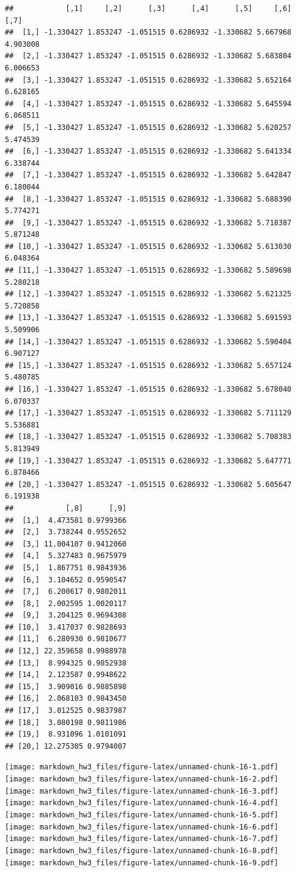 \documentclass[]{article}
\begin{document}
\begin{verbatim}
##            [,1]     [,2]      [,3]      [,4]      [,5]     [,6]     [,7]
##  [1,] -1.330427 1.853247 -1.051515 0.6286932 -1.330682 5.667968 4.903008
##  [2,] -1.330427 1.853247 -1.051515 0.6286932 -1.330682 5.683804 6.006653
##  [3,] -1.330427 1.853247 -1.051515 0.6286932 -1.330682 5.652164 6.628165
##  [4,] -1.330427 1.853247 -1.051515 0.6286932 -1.330682 5.645594 6.068511
##  [5,] -1.330427 1.853247 -1.051515 0.6286932 -1.330682 5.620257 5.474539
##  [6,] -1.330427 1.853247 -1.051515 0.6286932 -1.330682 5.641334 6.338744
##  [7,] -1.330427 1.853247 -1.051515 0.6286932 -1.330682 5.642847 6.180044
##  [8,] -1.330427 1.853247 -1.051515 0.6286932 -1.330682 5.688390 5.774271
##  [9,] -1.330427 1.853247 -1.051515 0.6286932 -1.330682 5.718387 5.871248
## [10,] -1.330427 1.853247 -1.051515 0.6286932 -1.330682 5.613030 6.048364
## [11,] -1.330427 1.853247 -1.051515 0.6286932 -1.330682 5.589698 5.280218
## [12,] -1.330427 1.853247 -1.051515 0.6286932 -1.330682 5.621325 5.720858
## [13,] -1.330427 1.853247 -1.051515 0.6286932 -1.330682 5.691593 5.509906
## [14,] -1.330427 1.853247 -1.051515 0.6286932 -1.330682 5.590404 6.907127
## [15,] -1.330427 1.853247 -1.051515 0.6286932 -1.330682 5.657124 5.480785
## [16,] -1.330427 1.853247 -1.051515 0.6286932 -1.330682 5.678040 6.070337
## [17,] -1.330427 1.853247 -1.051515 0.6286932 -1.330682 5.711129 5.536881
## [18,] -1.330427 1.853247 -1.051515 0.6286932 -1.330682 5.708383 5.813949
## [19,] -1.330427 1.853247 -1.051515 0.6286932 -1.330682 5.647771 6.878466
## [20,] -1.330427 1.853247 -1.051515 0.6286932 -1.330682 5.605647 6.191938
##            [,8]      [,9]
##  [1,]  4.473581 0.9799366
##  [2,]  3.738244 0.9552652
##  [3,] 11.004107 0.9412060
##  [4,]  5.327483 0.9675979
##  [5,]  1.867751 0.9843936
##  [6,]  3.104652 0.9590547
##  [7,]  6.200617 0.9802011
##  [8,]  2.002595 1.0020117
##  [9,]  3.204125 0.9694308
## [10,]  3.417037 0.9828693
## [11,]  6.280930 0.9810677
## [12,] 22.359658 0.9988978
## [13,]  8.994325 0.9852938
## [14,]  2.123587 0.9948622
## [15,]  3.909016 0.9885898
## [16,]  2.068103 0.9843450
## [17,]  3.012525 0.9837987
## [18,]  3.080198 0.9811986
## [19,]  8.931096 1.0101091
## [20,] 12.275305 0.9794007
\end{verbatim}

\texttt{[image: markdown\_hw3\_files/figure-latex/unnamed-chunk-16-1.pdf]}
\texttt{[image: markdown\_hw3\_files/figure-latex/unnamed-chunk-16-2.pdf]}
\texttt{[image: markdown\_hw3\_files/figure-latex/unnamed-chunk-16-3.pdf]}
\texttt{[image: markdown\_hw3\_files/figure-latex/unnamed-chunk-16-4.pdf]}
\texttt{[image: markdown\_hw3\_files/figure-latex/unnamed-chunk-16-5.pdf]}
\texttt{[image: markdown\_hw3\_files/figure-latex/unnamed-chunk-16-6.pdf]}
\texttt{[image: markdown\_hw3\_files/figure-latex/unnamed-chunk-16-7.pdf]}
\texttt{[image: markdown\_hw3\_files/figure-latex/unnamed-chunk-16-8.pdf]}
\texttt{[image: markdown\_hw3\_files/figure-latex/unnamed-chunk-16-9.pdf]}
\end{document}
